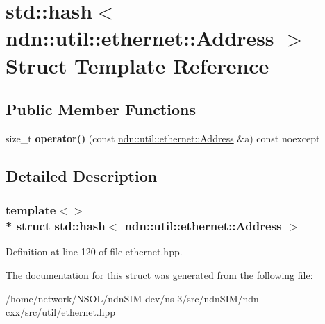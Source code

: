 \hypertarget{structstd_1_1hash_3_01ndn_1_1util_1_1ethernet_1_1Address_01_4}{}\section{std\+:\+:hash$<$ ndn\+:\+:util\+:\+:ethernet\+:\+:Address $>$ Struct Template Reference}
\label{structstd_1_1hash_3_01ndn_1_1util_1_1ethernet_1_1Address_01_4}
\subsection*{Public Member Functions}
\begin{DoxyCompactItemize}
\item 
size\+\_\+t {\bfseries operator()} (const \hyperlink{classndn_1_1util_1_1ethernet_1_1Address}{ndn\+::util\+::ethernet\+::\+Address} \&a) const noexcept\hypertarget{structstd_1_1hash_3_01ndn_1_1util_1_1ethernet_1_1Address_01_4_a88f7196ab2811a85feaddd2c3704f807}{}\label{structstd_1_1hash_3_01ndn_1_1util_1_1ethernet_1_1Address_01_4_a88f7196ab2811a85feaddd2c3704f807}

\end{DoxyCompactItemize}


\subsection{Detailed Description}
\subsubsection*{template$<$$>$\\*
struct std\+::hash$<$ ndn\+::util\+::ethernet\+::\+Address $>$}



Definition at line 120 of file ethernet.\+hpp.



The documentation for this struct was generated from the following file\+:\begin{DoxyCompactItemize}
\item 
/home/network/\+N\+S\+O\+L/ndn\+S\+I\+M-\/dev/ns-\/3/src/ndn\+S\+I\+M/ndn-\/cxx/src/util/ethernet.\+hpp\end{DoxyCompactItemize}
